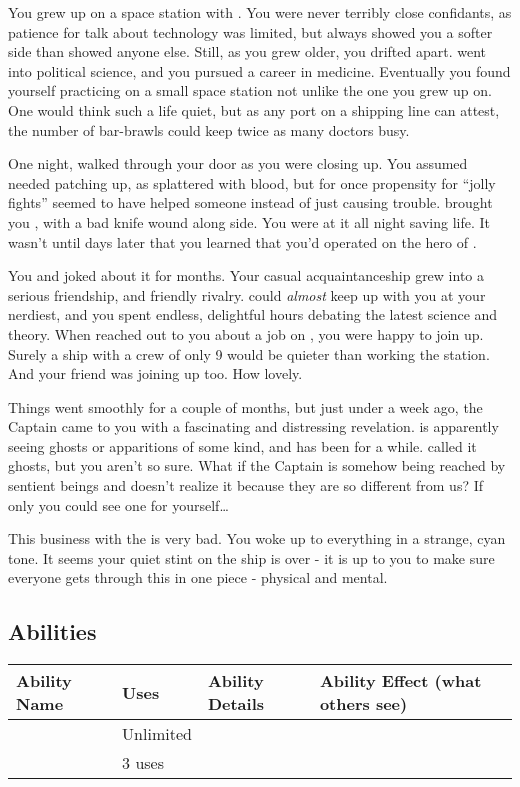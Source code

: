 \documentclass[char]{TMFHope}
\begin{document}
\name{\cMed{}}

You grew up on a space station with \cDip{\full}. You were never terribly close confidants, as \cDip{\their} patience for talk about technology was limited, but \cDip{\they} always showed you a softer side than \cDip{\they}showed anyone else. Still, as you grew older, you drifted apart. \cDip{} went into political science, and you pursued a career in medicine. Eventually you found yourself practicing on a small space station not unlike the one you grew up on. One would think such a life quiet, but as any port on a shipping line can attest, the number of bar-brawls could keep twice as many doctors busy.

One night, \cSci{\full} walked through your door as you were closing up. You assumed \cSci{\they} needed patching up, as \cSci{\they} \cSci{\were} splattered with blood, but for once \cSci{\their} propensity for ``jolly fights'' seemed to have helped someone instead of just causing trouble. \cSci{\They} brought you \cCap{\full}, with a bad knife wound along \cCap{\their} side. You were at it all night saving \cCap{\their} life. It wasn't until days later that you learned that you'd operated on the hero of \pBattle{}.

You and \cSci{} joked about it for months. Your casual acquaintanceship grew into a serious friendship, and friendly rivalry. \cSci{} could \emph{almost} keep up with you at your nerdiest, and you spent endless, delightful hours debating the latest science and theory. When \cCap{} reached out to you about a job on \pNew{}, you were happy to join up. Surely a ship with a crew of only 9 would be quieter than working the station. And your friend \cSci{} was joining up too. How lovely.

Things went smoothly for a couple of months, but just under a week ago, the Captain came to you with a fascinating and distressing revelation. \cCap{} is apparently seeing ghosts or apparitions of some kind, and has been for a while. \cCap{\They} called it ghosts, but you aren't so sure. What if the Captain is somehow being reached by sentient beings and doesn't realize it because they are so different from us? If only you could see one for yourself\ldots

This business with the \pNew{} is very bad. You woke up to everything in a strange, cyan tone. It seems your quiet stint on the ship is over - it is up to you to make sure everyone gets through this in one piece - physical and mental.

\subsection*{Abilities}
\begin{tabular}{|p{3cm}|p{1.5cm}|p{6.5cm}|p{5cm}|} 
 \hline
 \textbf{Ability Name} & \textbf{Uses} & \textbf{Ability Details} & \textbf{Ability Effect (what others see)} \\ 
\hline 
 \aInvestigation{\MYname} & Unlimited & \aInvestigation{\MYtext} & \aInvestigation{\MYeffect} \\ 
\hline 
\aFirstAid{\MYname} & 3 uses & \aFirstAid{\MYtext} & \aFirstAid{\MYeffect}\\ 
 \hline
\end{tabular}
\end{document}
